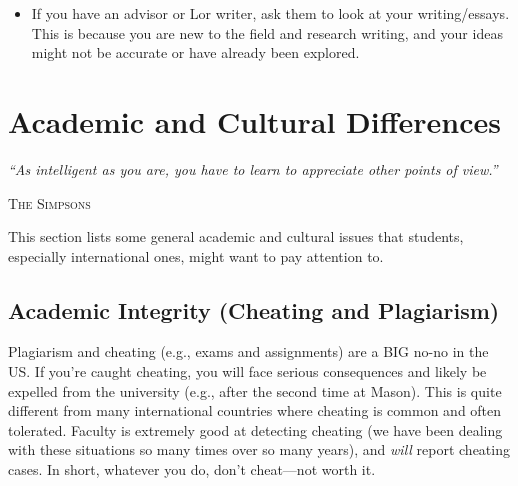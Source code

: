 \documentclass[oneside,11pt,dvipsnames]{book}
\newcommand{\myepigraphsimpsons}[1]{
\epigraph{\vspace{-0.2in} \emph{#1}}{\textsc{The Simpsons}}
}
\begin{document}
\begin{itemize}

\item If you have an advisor or Lor writer, ask them to look at your writing/essays. This is because you are new to the field and research writing, and your ideas might not be accurate or have already been explored.

\end{itemize}




\chapter{Academic and Cultural Differences}\label{sec:cultural}

\myepigraphsimpsons{``As intelligent as you are, you have to learn to appreciate other points of view.''}

This section lists some general academic and cultural issues that students, especially international ones, might want to pay attention to.


\section{Academic Integrity (Cheating and Plagiarism)}

Plagiarism and cheating (e.g., exams and assignments) are a BIG no-no in the US.  If you're caught cheating, you will face serious consequences and likely be expelled from the university (e.g., after the second time at Mason).   This is quite different from many international countries where cheating is common and often tolerated.  Faculty is extremely good at detecting cheating (we have been dealing with these situations so many times over so many years), and \emph{will} report cheating cases.  In short, whatever you do, don't cheat---not worth it.
\end{document}
